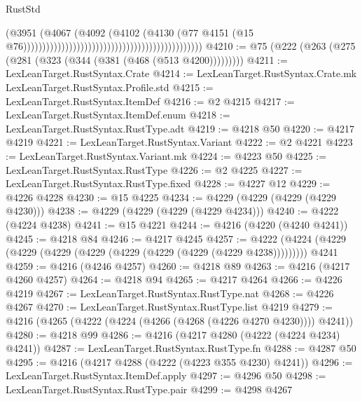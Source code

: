 \begin{lexlean}{RustStd}
\begin{coremodule}
                                                                                    (@3951
                                                                                      (@4067
                                                                                        (@4092
                                                                                          (@4102
                                                                                            (@4130
                                                                                              (@77
                                                                                                @4151
                                                                                                (@15
                                                                                                  @76)))))))))))))))))))))))))))))))))))))))))))))))
@4210 := @75 (@222 (@263 (@275 (@281 (@323 (@344 (@381 (@468 (@513 @4200)))))))))
@4211 := LexLeanTarget.RustSyntax.Crate
@4214 := LexLeanTarget.RustSyntax.Crate.mk LexLeanTarget.RustSyntax.Profile.std
@4215 := LexLeanTarget.RustSyntax.ItemDef
@4216 := @2 @4215
@4217 := LexLeanTarget.RustSyntax.ItemDef.enum
@4218 := LexLeanTarget.RustSyntax.RustType.adt
@4219 := @4218 @50
@4220 := @4217 @4219
@4221 := LexLeanTarget.RustSyntax.Variant
@4222 := @2 @4221
@4223 := LexLeanTarget.RustSyntax.Variant.mk
@4224 := @4223 @50
@4225 := LexLeanTarget.RustSyntax.RustType
@4226 := @2 @4225
@4227 := LexLeanTarget.RustSyntax.RustType.fixed
@4228 := @4227 @12
@4229 := @4226 @4228
@4230 := @15 @4225
@4234 := @4229 (@4229 (@4229 (@4229 @4230)))
@4238 := @4229 (@4229 (@4229 (@4229 @4234)))
@4240 := @4222 (@4224 @4238)
@4241 := @15 @4221
@4244 := @4216 (@4220 (@4240 @4241))
@4245 := @4218 @84
@4246 := @4217 @4245
@4257 := @4222 (@4224 (@4229 (@4229 (@4229 (@4229 (@4229 (@4229 (@4229 (@4229 @4238))))))))) @4241
@4259 := @4216 (@4246 @4257)
@4260 := @4218 @89
@4263 := @4216 (@4217 @4260 @4257)
@4264 := @4218 @94
@4265 := @4217 @4264
@4266 := @4226 @4219
@4267 := LexLeanTarget.RustSyntax.RustType.nat
@4268 := @4226 @4267
@4270 := LexLeanTarget.RustSyntax.RustType.list @4219
@4279 := @4216 (@4265 (@4222 (@4224 (@4266 (@4268 (@4226 @4270 @4230)))) @4241))
@4280 := @4218 @99
@4286 := @4216 (@4217 @4280 (@4222 (@4224 @4234) @4241))
@4287 := LexLeanTarget.RustSyntax.RustType.fn
@4288 := @4287 @50
@4295 := @4216 (@4217 @4288 (@4222 (@4223 @355 @4230) @4241))
@4296 := LexLeanTarget.RustSyntax.ItemDef.apply
@4297 := @4296 @50
@4298 := LexLeanTarget.RustSyntax.RustType.pair
@4299 := @4298 @4267

\end{coremodule}
\end{lexlean}
